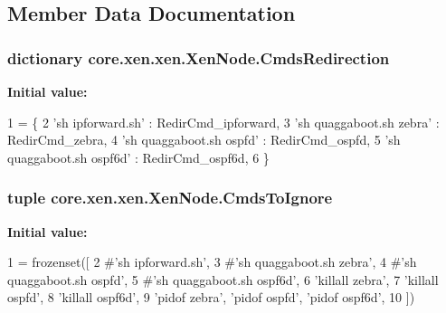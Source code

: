 \subsection{Member Data Documentation}
\hypertarget{classcore_1_1xen_1_1xen_1_1_xen_node_a7a6b56c33ce11024eb9b12347bcefbc0}{
\subsubsection[{Cmds\+Redirection}]{\setlength{\rightskip}{0pt plus 5cm}dictionary core.\+xen.\+xen.\+Xen\+Node.\+Cmds\+Redirection\hspace{0.3cm}{\ttfamily [static]}}}\label{classcore_1_1xen_1_1xen_1_1_xen_node_a7a6b56c33ce11024eb9b12347bcefbc0}
{\bfseries Initial value\+:}
\begin{DoxyCode}
1 = \{
2         \textcolor{stringliteral}{'sh ipforward.sh'} : RedirCmd\_ipforward,
3         \textcolor{stringliteral}{'sh quaggaboot.sh zebra'} : RedirCmd\_zebra,
4         \textcolor{stringliteral}{'sh quaggaboot.sh ospfd'} : RedirCmd\_ospfd,
5         \textcolor{stringliteral}{'sh quaggaboot.sh ospf6d'} : RedirCmd\_ospf6d,
6     \}
\end{DoxyCode}
\hypertarget{classcore_1_1xen_1_1xen_1_1_xen_node_a22f75c055aa42f2d764351729759b2e7}{
\subsubsection[{Cmds\+To\+Ignore}]{\setlength{\rightskip}{0pt plus 5cm}tuple core.\+xen.\+xen.\+Xen\+Node.\+Cmds\+To\+Ignore\hspace{0.3cm}{\ttfamily [static]}}}\label{classcore_1_1xen_1_1xen_1_1_xen_node_a22f75c055aa42f2d764351729759b2e7}
{\bfseries Initial value\+:}
\begin{DoxyCode}
1 = frozenset([
2         \textcolor{comment}{#'sh ipforward.sh',}
3         \textcolor{comment}{#'sh quaggaboot.sh zebra',}
4         \textcolor{comment}{#'sh quaggaboot.sh ospfd',}
5         \textcolor{comment}{#'sh quaggaboot.sh ospf6d',}
6         \textcolor{stringliteral}{'killall zebra'},
7         \textcolor{stringliteral}{'killall ospfd'},
8         \textcolor{stringliteral}{'killall ospf6d'},
9         \textcolor{stringliteral}{'pidof zebra'}, \textcolor{stringliteral}{'pidof ospfd'}, \textcolor{stringliteral}{'pidof ospf6d'},
10     ])
\end{DoxyCode}
